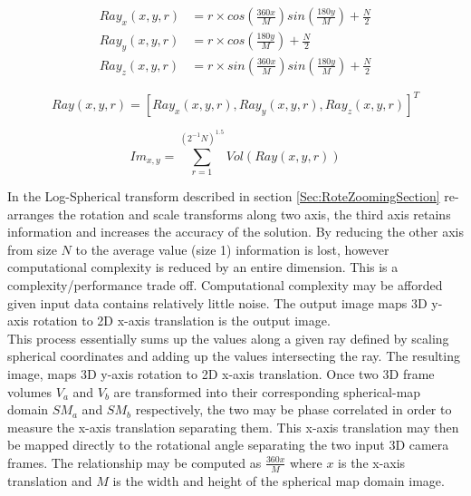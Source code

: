 \begin{equation} \label{eqn:invLPFuncs}
\begin{split}
Ray_x(x,y,r) & = r \times cos\left(\frac{360x}{M}\right)sin\left(\frac{180y}{M}\right)  + \frac{N}{2} \\
Ray_y(x,y,r) & = r \times cos\left(\frac{180y}{M}\right) + \frac{N}{2} \\
Ray_z(x,y,r) & = r \times sin\left(\frac{360x}{M}\right)sin\left(\frac{180y}{M}\right) + \frac{N}{2}
\end{split}
\end{equation}

\begin{equation} \label{eqn:invLPVVF}
Ray(x,y,r) = [Ray_x(x,y,r), Ray_y(x,y,r), Ray_z(x,y,r)]^T
\end{equation}

\begin{equation} \label{eqn:smtUpdate}
Im_{x,y} = \sum_{r=1}^{(2^{-1}N)^{1.5}}{Vol(Ray(x,y,r))} 
\end{equation}

In the Log-Spherical transform described in section \ref{Sec:RoteZoomingSection} re-arranges the rotation and scale transforms along two axis, the third axis retains information and increases the accuracy of the solution. By reducing the other axis from size $N$ to the average value (size 1) information is lost, however computational complexity is reduced by an entire dimension. This is a complexity/performance trade off. Computational complexity may be afforded given input data contains relatively little noise. The output image maps 3D y-axis rotation to 2D x-axis translation is the output image. \\


This process essentially sums up the values along a given ray defined by scaling spherical coordinates and adding up the values intersecting the ray. The resulting image, maps 3D y-axis rotation to 2D x-axis translation. Once two 3D frame volumes $V_a$ and $V_b$ are transformed into their corresponding spherical-map domain $SM_a$ and $SM_b$ respectively, the two may be phase correlated  in order to measure the x-axis translation separating them. This x-axis translation may then be mapped directly to the rotational angle separating the two input 3D camera frames. The relationship may be computed as $\frac{360x}{M}$ where $x$ is the x-axis translation and $M$ is the width and height of the spherical map domain image. \\


